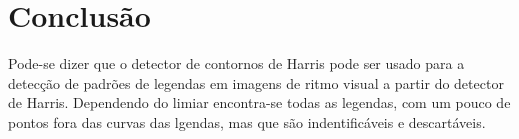 \documentclass[10pt,a4paper]{article}
\begin{document}
\newpage
\section{Conclusão}
Pode-se dizer que o detector de contornos de Harris pode 
ser usado para a detecção de padrões de legendas em imagens de ritmo visual a
partir do detector de Harris.
Dependendo do limiar encontra-se todas as legendas, com um pouco de
pontos fora das curvas das lgendas, mas que são indentificáveis e descartáveis.


\begin{small}
  
\end{small}
\end{document}
